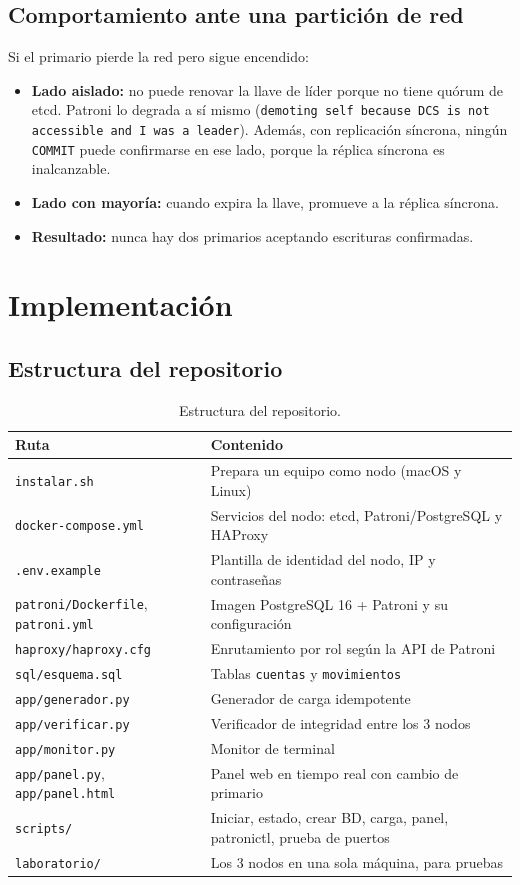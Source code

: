 \documentclass[11pt,a4paper]{article}
\newcommand{\cod}[1]{\texttt{#1}}
\begin{document}
\subsection{Comportamiento ante una partición de red}

Si el primario pierde la red pero sigue encendido:
\begin{itemize}
  \item \textbf{Lado aislado:} no puede renovar la llave de líder porque no tiene quórum de etcd. Patroni lo degrada a sí mismo (\cod{demoting self because DCS is not accessible and I was a leader}). Además, con replicación síncrona, ningún \cod{COMMIT} puede confirmarse en ese lado, porque la réplica síncrona es inalcanzable.
  \item \textbf{Lado con mayoría:} cuando expira la llave, promueve a la réplica síncrona.
  \item \textbf{Resultado:} nunca hay dos primarios aceptando escrituras confirmadas.
\end{itemize}

\section{Implementación}

\subsection{Estructura del repositorio}

\begin{table}[H]
\centering
\small
\caption{Estructura del repositorio.}
\begin{tabularx}{\textwidth}{@{}L{5.4cm}Y@{}}
\toprule
\textbf{Ruta} & \textbf{Contenido} \\
\midrule
\cod{instalar.sh} & Prepara un equipo como nodo (macOS y Linux) \\
\cod{docker-compose.yml} & Servicios del nodo: etcd, Patroni/PostgreSQL y HAProxy \\
\cod{.env.example} & Plantilla de identidad del nodo, IP y contraseñas \\
\cod{patroni/Dockerfile}, \cod{patroni.yml} & Imagen PostgreSQL 16 + Patroni y su configuración \\
\cod{haproxy/haproxy.cfg} & Enrutamiento por rol según la API de Patroni \\
\cod{sql/esquema.sql} & Tablas \cod{cuentas} y \cod{movimientos} \\
\cod{app/generador.py} & Generador de carga idempotente \\
\cod{app/verificar.py} & Verificador de integridad entre los 3 nodos \\
\cod{app/monitor.py} & Monitor de terminal \\
\cod{app/panel.py}, \cod{app/panel.html} & Panel web en tiempo real con cambio de primario \\
\cod{scripts/} & Iniciar, estado, crear BD, carga, panel, patronictl, prueba de puertos \\
\cod{laboratorio/} & Los 3 nodos en una sola máquina, para pruebas \\
\bottomrule
\end{tabularx}
\end{table}
\end{document}
